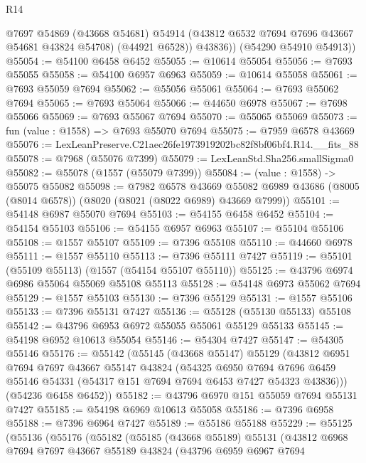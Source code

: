 \begin{lexlean}{R14}
\begin{coremodule}
            @7697
            @54869
            (@43668 @54681)
            @54914
            (@43812 @6532 @7694 @7696 @43667 @54681 @43824 @54708)
            (@44921 @6528))
          @43836))
      (@54290 @54910 @54913))
@55054 := @54100 @6458 @6452
@55055 := @10614 @55054
@55056 := @7693 @55055
@55058 := @54100 @6957 @6963
@55059 := @10614 @55058
@55061 := @7693 @55059 @7694
@55062 := @55056 @55061
@55064 := @7693 @55062 @7694
@55065 := @7693 @55064
@55066 := @44650 @6978
@55067 := @7698 @55066
@55069 := @7693 @55067 @7694
@55070 := @55065 @55069
@55073 := fun (value : @1558) => @7693 @55070 @7694
@55075 := @7959 @6578 @43669
@55076 := LexLeanPreserve.C21aec26fe1973919202bc82f8bf06bf4.R14.__fits_88
@55078 := @7968 (@55076 @7399)
@55079 := LexLeanStd.Sha256.smallSigma0
@55082 := @55078 (@1557 (@55079 @7399))
@55084 := (value : @1558) -> @55075 @55082
@55098 := @7982
    @6578
    @43669
    @55082
    @6989
    @43686
    (@8005 (@8014 @6578))
    (@8020 (@8021 (@8022 @6989) @43669 @7999))
@55101 := @54148 @6987 @55070 @7694
@55103 := @54155 @6458 @6452
@55104 := @54154 @55103
@55106 := @54155 @6957 @6963
@55107 := @55104 @55106
@55108 := @1557 @55107
@55109 := @7396 @55108
@55110 := @44660 @6978
@55111 := @1557 @55110
@55113 := @7396 @55111 @7427
@55119 := @55101 (@55109 @55113) (@1557 (@54154 @55107 @55110))
@55125 := @43796 @6974 @6986 @55064 @55069 @55108 @55113
@55128 := @54148 @6973 @55062 @7694
@55129 := @1557 @55103
@55130 := @7396 @55129
@55131 := @1557 @55106
@55133 := @7396 @55131 @7427
@55136 := @55128 (@55130 @55133) @55108
@55142 := @43796 @6953 @6972 @55055 @55061 @55129 @55133
@55145 := @54198 @6952 @10613 @55054
@55146 := @54304 @7427
@55147 := @54305 @55146
@55176 := @55142
    (@55145
      (@43668 @55147)
      @55129
      (@43812
        @6951
        @7694
        @7697
        @43667
        @55147
        @43824
        (@54325
          @6950
          @7694
          @7696
          @6459
          @55146
          @54331
          (@54317 @151 @7694 @7694 @6453 @7427 @54323 @43836)))
      (@54236 @6458 @6452))
@55182 := @43796 @6970 @151 @55059 @7694 @55131 @7427
@55185 := @54198 @6969 @10613 @55058
@55186 := @7396 @6958
@55188 := @7396 @6964 @7427
@55189 := @55186 @55188
@55229 := @55125
    (@55136
      (@55176
        (@55182
          (@55185
            (@43668 @55189)
            @55131
            (@43812
              @6968
              @7694
              @7697
              @43667
              @55189
              @43824
              (@43796
                @6959
                @6967
                @7694

\end{coremodule}
\end{lexlean}

